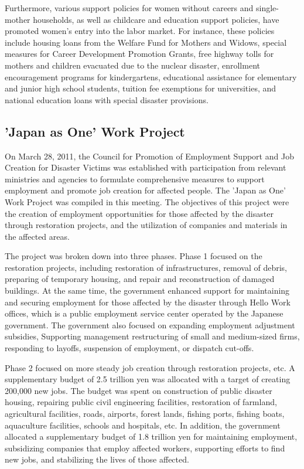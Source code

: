 \documentclass[a4paper,12pt]{article}
\begin{document}
Furthermore, various support policies for women without careers and single-mother households, as well as childcare and education support policies, have promoted women's entry into the labor market. For instance, these policies include housing loans from the Welfare Fund for Mothers and Widows, special measures for Career Development Promotion Grants, free highway tolls for mothers and children evacuated due to the nuclear disaster, enrollment encouragement programs for kindergartens, educational assistance for elementary and junior high school students, tuition fee exemptions for universities, and national education loans with special disaster provisions.

\subsection{'Japan as One' Work Project}

On March 28, 2011, the Council for Promotion of Employment Support and Job Creation for Disaster Victims was established with participation from relevant ministries and agencies to formulate comprehensive measures to support employment and promote job creation for affected people. The 'Japan as One' Work Project was compiled in this meeting. The objectives of this project were the creation of employment opportunities for those affected by the disaster through restoration projects, and the utilization of companies and materials in the affected areas.


The project was broken down into three phases. Phase 1 focused on the restoration projects, including restoration of infrastructures, removal of debris, preparing of temporary housing, and repair and reconstruction of damaged buildings. At the same time, the government enhanced support for maintaining and securing employment for those affected by the disaster through Hello Work offices, which is a public employment service center operated by the Japanese government. The government also focused on expanding employment adjustment subsidies, Supporting management restructuring of small and medium-sized firms, responding to layoffs, suspension of employment, or dispatch cut-offs.

Phase 2 focused on more steady job creation through restoration projects, etc. A supplementary budget of 2.5 trillion yen was allocated with a target of creating 200,000 new jobs. The budget was spent on construction of public disaster housing, repairing public civil engineering facilities, restoration of farmland, agricultural facilities, roads, airports, forest lands, fishing ports, fishing boats, aquaculture facilities, schools and hospitals, etc. In addition, the government allocated a supplementary budget of 1.8 trillion yen for maintaining employment, subsidizing companies that employ affected workers, supporting efforts to find new jobs, and stabilizing the lives of those affected.
\end{document}

